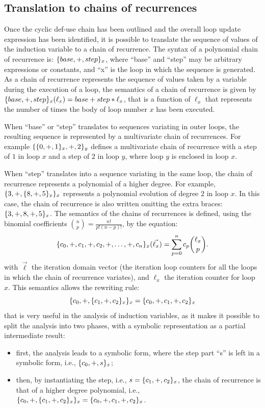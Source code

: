 \subsection{Translation to chains of recurrences}

Once the cyclic def-use chain has been outlined and the overall loop
update expression has been identified, it is possible to translate the
sequence of values of the induction variable to a chain of recurrence.
The syntax of a polynomial chain of recurrence is: $\{base, +,
  step\}_x$, where ``base'' and ``step'' may be arbitrary expressions
or constants, and ``x'' is the loop in which the sequence is
generated.  As a chain of recurrence represents the sequence of values
taken by a variable during the execution of a loop, the semantics of a
chain of recurrence is given by $\{base, +, step\}_x (\ell_x) =
base + step * \ell_x$, that is a function of $\ell_x$ that represents
the number of times the body of loop number $x$ has been executed.

When ``base'' or ``step'' translates to sequences variating in outer
loops, the resulting sequence is represented by a multivariate chain
of recurrences.  For example $\{\{0, +, 1\}_x, +, 2\}_y$
defines a multivariate chain of recurrence with a step of $1$ in loop
$x$ and a step of $2$ in loop $y$, where loop $y$ is enclosed in loop
$x$.

When ``step'' translates into a sequence variating in the same loop,
the chain of recurrence represents a polynomial of a higher degree.
For example, $\{3, +, \{8, +, 5\}_x\}_x$ represents a
polynomial evolution of degree $2$ in loop $x$.  In this case,
the chain of recurrence is also written omitting the extra braces:
$\{3, +, 8, +, 5\}_x$.  The semantics of the chains of recurrences
is defined, using the binomial coefficients $\binom{n}{p} = \frac{n!}{p!(n-p)!}$, by the
equation:
\begin{equation*}
  \{c_0,+,c_1,+,c_2,+,\ldots,+,c_n\}_x(\vec{\ell_x})=
  \sum_{p=0}^{n}c_{p}\binom{\ell_x}{p}.
\end{equation*}
with $\vec{\ell}$ the iteration domain vector (the iteration loop
counters for all the loops in which the chain of recurrence variates),
and $\ell_x$ the iteration counter for loop $x$.  This semantics allows
the rewriting rule:
\begin{equation*}
  \{c_0, +, \{c_1, +, c_2\}_x\}_x = \{c_0, +, c_1, +, c_2\}_x
\end{equation*}
that is very useful in the analysis of induction variables, as it
makes it possible to split the analysis into two phases, with a
symbolic representation as a partial intermediate result:
\begin{itemize}
\item first, the analysis leads to a symbolic form, where the step
  part ``s'' is left in a symbolic form, i.e., $\{c_0, +, s\}_x$;
\item then, by instantiating the step, i.e., $s = \{c_1, +,
  c_2\}_x$, the chain of recurrence is that of a higher degree
  polynomial, i.e., $\{c_0, +, \{c_1, +, c_2\}_x\}_x =
  \{c_0, +, c_1, +, c_2\}_x$.
\end{itemize}

